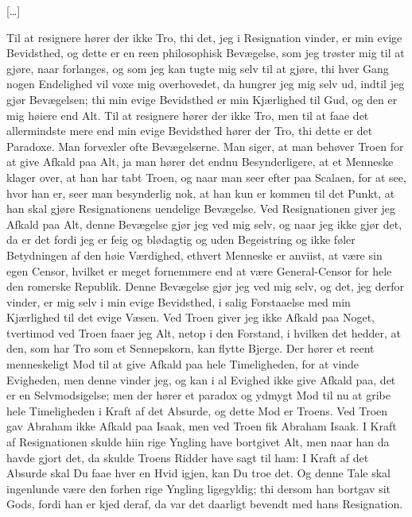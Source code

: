 \documentclass[12pt,a4paper]{article}
\begin{document}
[…]

Til at resignere hører der ikke Tro, thi det, jeg i Resignation vinder, er min evige Bevidsthed, og dette er en reen philosophisk Bevægelse, som jeg trøster mig til at gjøre, naar forlanges, og som jeg kan tugte mig selv til at gjøre, thi hver Gang nogen Endelighed vil voxe mig overhovedet, da hungrer jeg mig selv ud, indtil jeg gjør Bevægelsen; thi min evige Bevidsthed er min Kjærlighed til Gud, og den er mig høiere end Alt. Til at resignere hører der ikke Tro, men til at faae det allermindste mere end min evige Bevidsthed hører der Tro, thi dette er det Paradoxe. Man forvexler ofte Bevægelserne. Man siger, at man behøver Troen for at give Afkald paa Alt, ja man hører det endnu Besynderligere, at et Menneske klager over, at han har tabt Troen, og naar man seer efter paa Scalaen, for at see, hvor han er, seer man besynderlig nok, at han kun er kommen til det Punkt, at han skal gjøre Resignationens uendelige Bevægelse. Ved Resignationen giver jeg Afkald paa Alt, denne Bevægelse gjør jeg ved mig selv, og naar jeg ikke gjør det, da er det fordi jeg er feig og blødagtig og uden Begeistring og ikke føler Betydningen af den høie Værdighed, ethvert Menneske er anviist, at være sin egen Censor, hvilket er meget fornemmere end at være General-Censor for hele den romerske Republik. Denne Bevægelse gjør jeg ved mig selv, og det, jeg derfor vinder, er mig selv i min evige Bevidsthed, i salig Forstaaelse med min Kjærlighed til det evige Væsen. Ved Troen giver jeg ikke Afkald paa Noget, tvertimod ved Troen faaer jeg Alt, netop i den Forstand, i hvilken det hedder, at den, som har Tro som et Sennepskorn, kan flytte Bjerge. Der hører et reent menneskeligt Mod til at give Afkald paa hele Timeligheden, for at vinde Evigheden, men denne vinder jeg, og kan i al Evighed ikke give Afkald paa, det er en Selvmodsigelse; men der hører et paradox og ydmygt Mod til nu at gribe hele Timeligheden i Kraft af det Absurde, og dette Mod er Troens. Ved Troen gav Abraham ikke Afkald paa Isaak, men ved Troen fik Abraham Isaak. I Kraft af Resignationen skulde hiin rige Yngling have bortgivet Alt, men naar han da havde gjort det, da skulde Troens Ridder have sagt til ham: I Kraft af det Absurde skal Du faae hver en Hvid igjen, kan Du troe det. Og denne Tale skal ingenlunde være den forhen rige Yngling ligegyldig; thi dersom han bortgav sit Gods, fordi han er kjed deraf, da var det daarligt bevendt med hans Resignation.
\end{document}
